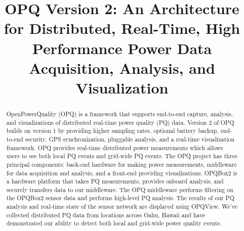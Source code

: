 \documentclass[a4paper, conference]{IEEEtran}
\begin{document}
%
\title{OPQ Version 2: An Architecture for Distributed, Real-Time, High Performance Power Data Acquisition, Analysis, and Visualization}


\author{
}


\maketitle

\begin{abstract}
OpenPowerQuality (OPQ) is a framework that supports end-to-end capture, analysis, and visualizations of distributed real-time power quality (PQ) data. Version 2 of OPQ builds on version 1 by providing higher sampling rates, optional battery backup, end-to-end security, GPS synchronization, pluggable analysis, and a real-time visualization framework. OPQ provides real-time distributed power measurements which allows users to see both local PQ events and grid-wide PQ events. The OPQ project has three principal components: back-end hardware for making power measurements, middleware for data acquisition and analysis, and a front-end providing visualizations. OPQBox2 is a hardware platform that takes PQ measurements, provides onboard analysis, and securely transfers data to our middleware. The OPQ middleware performs filtering on the OPQBox2 sensor data and performs high-level PQ analysis. The results of our PQ analysis and real-time state of the sensor network are displayed using OPQView. We've collected distributed PQ data from locations across Oahu, Hawaii and have demonstrated our ability to detect both local and grid-wide power quality events.
\end{abstract}
\IEEEpeerreviewmaketitle
\end{document}
